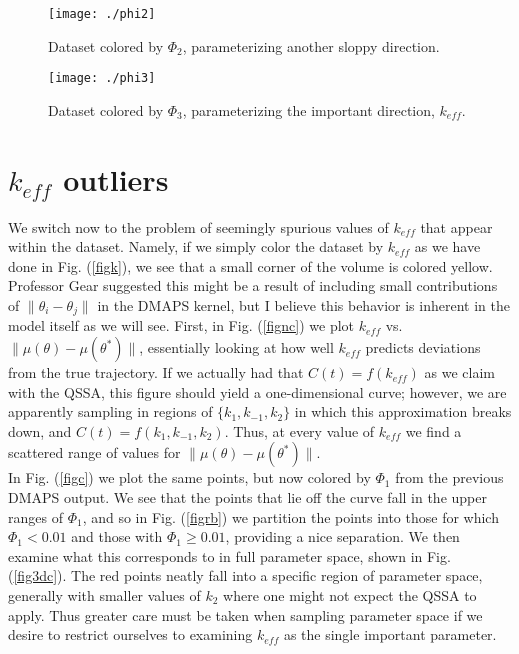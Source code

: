 \documentclass[11pt]{article}
\begin{document}
\begin{figure}[htbp]
  \centering
  \texttt{[image: ./phi2]}
  \caption{Dataset colored by $\Phi_2$, parameterizing another sloppy
    direction. \label{fig2}}
\end{figure}

\begin{figure}[htbp]
  \centering
  \texttt{[image: ./phi3]}
  \caption{Dataset colored by $\Phi_3$, parameterizing the important
    direction, $k_{eff}$. \label{fig3}}
\end{figure}

\clearpage

\section{$k_{eff}$ outliers}

We switch now to the problem of seemingly spurious values of $k_{eff}$
that appear within the dataset. Namely, if we simply color the dataset
by $k_{eff}$ as we have done in Fig. (\ref{figk}), we see that a small
corner of the volume is colored yellow. Professor Gear suggested this
might be a result of including small contributions of
$\| \theta_i - \theta_j \|$ in the DMAPS kernel, but I believe this
behavior is inherent in the model itself as we will see. First, in
Fig. (\ref{fignc}) we plot $k_{eff}$ vs.
$\| \mu(\theta) - \mu(\theta^*) \|$, essentially looking at how well
$k_{eff}$ predicts deviations from the true trajectory. If we actually
had that $C(t) = f(k_{eff})$ as we claim with the QSSA, this figure
should yield a one-dimensional curve; however, we are apparently
sampling in regions of $\{k_1, k_{-1}, k_2\}$ in which this
approximation breaks down, and $C(t) = f(k_1, k_{-1}, k_2)$. Thus, at
every value of $k_{eff}$ we find a scattered range of values for $\| \mu(\theta) - \mu(\theta^*) \|$. \\

In Fig. (\ref{figc}) we plot the same points, but now colored by
$\Phi_1$ from the previous DMAPS output. We see that the points that
lie off the curve fall in the upper ranges of $\Phi_1$, and so in
Fig. (\ref{figrb}) we partition the points into those for which
$\Phi_1 < 0.01$ and those with $\Phi_1 \ge 0.01$, providing a nice
separation. We then examine what this corresponds to in full parameter
space, shown in Fig. (\ref{fig3dc}). The red points neatly fall into a
specific region of parameter space, generally with smaller values of
$k_2$ where one might not expect the QSSA to apply. Thus greater care
must be taken when sampling parameter space if we desire to restrict
ourselves to examining $k_{eff}$ as the single important parameter.
\end{document}
